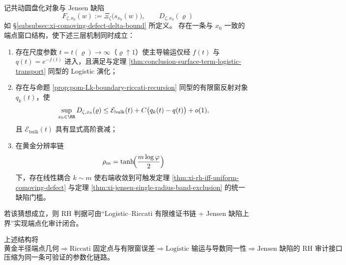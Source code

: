 \begin{conjecture}\label{conj:conclusion-endpoint-logistic-universality-rh-interface}
记共动圆盘化对象与 Jensen 缺陷
\[
F_{\zeta,x_0}(w):=\Xi_\zeta\!\bigl(s_{x_0}(w)\bigr),\qquad
D_{\zeta,x_0}(\varrho)
\]
如 \S\ref{subsubsec:xi-comoving-defect-delta-bound} 所定义。
存在一条与 \(x_0\) 一致的端点窗口结构，使下述三层机制同时成立：
\begin{enumerate}
  \item 存在尺度参数 \(t=t(\varrho)\to\infty\)（\(\varrho\uparrow1\)）使主导输运仅经 \(f(t)\) 与 \(q(t)=e^{-f(t)}\) 进入，且满足与定理 \ref{thm:conclusion-surface-term-logistic-transport} 同型的 Logistic 演化；
  \item 存在与命题 \ref{prop:pom-Lk-boundary-riccati-recursion} 同型的有限窗反射对象 \(q_k(t)\)，使
  \[
  \sup_{x_0\in\RR}D_{\zeta,x_0}(\varrho)
  \le
  \mathcal E_{\mathrm{bulk}}(t)+C\bigl(q_k(t)-q(t)\bigr)+o(1),
  \]
  且 \(\mathcal E_{\mathrm{bulk}}(t)\) 具有显式高阶衰减；
  \item 在黄金分辨率链
  \[
  \rho_m=\tanh\!\Bigl(\frac{m\log\varphi}{2}\Bigr)
  \]
  下，存在线性耦合 \(k\sim m\) 使右端收敛到可触发定理 \ref{thm:xi-rh-iff-uniform-comoving-defect} 与定理 \ref{thm:xi-jensen-single-radius-band-exclusion} 的统一缺陷门槛。
\end{enumerate}
若该猜想成立，则 RH 判据可由“Logistic--Riccati 有限维证书链 + Jensen 缺陷上界”实现端点化审计闭合。
\end{conjecture}

\begin{remark}[统一读出链]\label{rem:conclusion-golden-radius-riccati-logistic-chain}
上述结构将
\[
\text{黄金半径端点几何}
\Longrightarrow
\text{Riccati 固定点与有限窗误差}
\Longrightarrow
\text{Logistic 输运与导数同一性}
\Longrightarrow
\text{Jensen 缺陷的 RH 审计接口}
\]
压缩为同一条可验证的参数化链路。
\end{remark}
